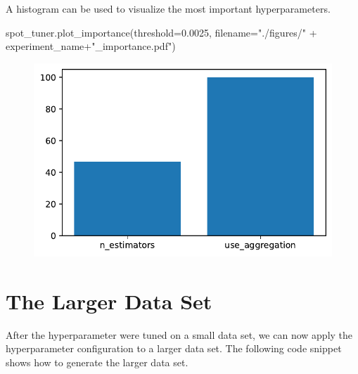\documentclass[
  letterpaper,
  DIV=11,
  numbers=noendperiod]{scrreprt}
\newenvironment{Shaded}{\begin{snugshade}}{\end{snugshade}}
\newcommand{\FloatTok}[1]{\textcolor[rgb]{0.68,0.00,0.00}{#1}}
\newcommand{\NormalTok}[1]{\textcolor[rgb]{0.00,0.23,0.31}{#1}}
\newcommand{\OperatorTok}[1]{\textcolor[rgb]{0.37,0.37,0.37}{#1}}
\newcommand{\StringTok}[1]{\textcolor[rgb]{0.13,0.47,0.30}{#1}}
\begin{document}
A histogram can be used to visualize the most important hyperparameters.

\begin{Shaded}
\begin{Highlighting}[]
\NormalTok{spot\_tuner.plot\_importance(threshold}\OperatorTok{=}\FloatTok{0.0025}\NormalTok{, filename}\OperatorTok{=}\StringTok{"./figures/"} \OperatorTok{+}\NormalTok{ experiment\_name}\OperatorTok{+}\StringTok{"\_importance.pdf"}\NormalTok{)}
\end{Highlighting}
\end{Shaded}

\begin{figure}[H]

{\centering \includegraphics{025_spot_hpt_river_friedman_amfr_files/figure-pdf/cell-23-output-1.pdf}

}

\end{figure}

\hypertarget{the-larger-data-set-1}{%
\section{The Larger Data Set}\label{the-larger-data-set-1}}

After the hyperparameter were tuned on a small data set, we can now
apply the hyperparameter configuration to a larger data set. The
following code snippet shows how to generate the larger data set.
\end{document}
